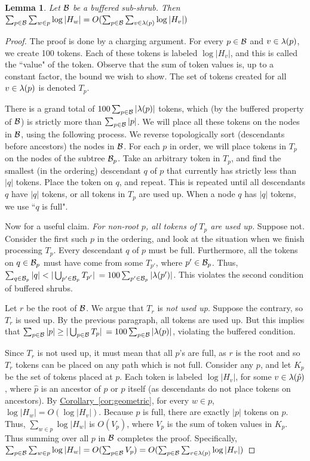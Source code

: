 \documentclass[11pt]{article}
\newtheorem{lemma}[theorem]{Lemma}
\theoremstyle{definition}
\newcommand{\Cor}[1]{\hyperref[cor:#1]{Corollary~\ref*{cor:#1}}} %
\begin{document}
\begin{lemma} \label{lem:buff}
 Let $\mathcal{B}$ be a buffered sub-shrub.  Then $\sum_{p\in \mathcal{B}}\sum_{w\in p} \log |H_w| = O(\sum_{p\in \mathcal{B}}\sum_{v\in \lambda(p)} \log |H_v| )$
\end{lemma}
\begin{proof} The proof is done by a charging argument. For every $p \in \mathcal{B}$
and $v \in \lambda(p)$, we create 100 tokens. Each of these tokens is labeled $\log |H_v|$,
and this is called the ``value" of the token. Observe that the sum of token values is, up to a constant
factor, the bound we wish to show. The set of tokens created for all $v \in \lambda(p)$ is denoted
$T_p$. 

There is a grand total of $100 \sum_{p \in \mathcal{B}} |\lambda(p)|$ tokens, which
(by the buffered property of $\mathcal{B}$) is strictly more than $\sum_{p \in \mathcal{B}} |p|$.
We will place all these tokens on the nodes in $\mathcal{B}$, using the following process.
We reverse topologically sort (descendants before ancestors) the nodes in $\mathcal{B}$.
For each $p$ in order, we will place tokens in $T_p$ on the nodes of the subtree $\mathcal{B}_p$.
Take an arbitrary token in $T_p$, and find the smallest (in the ordering) descendant $q$
of $p$ that currently has strictly less than $|q|$ tokens. Place the token on $q$,
and repeat. This is repeated until all descendants $q$ have $|q|$ tokens, or
all tokens in $T_p$ are used up. When a node $q$ has $|q|$ tokens, we use
``$q$ is full".

Now for a useful claim. \emph{For non-root $p$, all tokens of $T_p$ are used up.}
Suppose not. Consider the first such $p$ in the ordering, and look at the situation
when we finish processing $T_p$. Every descendant $q$ of $p$ must be full. Furthermore,
all the tokens on $q \in \mathcal{B}_p$ must have come from some $T_{p'}$, where $p' \in \mathcal{B}_p$.
Thus, $\sum_{q \in \mathcal{B}_p} |q| < |\bigcup_{p' \in \mathcal{B}_p} T_{p'}|$ $=100\sum_{p' \in \mathcal{B}_p} |\lambda(p')|$. This violates the second condition of buffered shrubs.

Let $r$ be the root of $\mathcal{B}$. We argue that $T_r$ is \emph{not used up}.
Suppose the contrary, so $T_r$ is used up. By the previous paragraph,
all tokens are used up. But this implies that $\sum_{p \in \mathcal{B}} |p| \geq |\bigcup_{p \in \mathcal{B}} T_p|$
$ = 100\sum_{p \in \mathcal{B}} |\lambda(p)|$, violating the buffered condition.

Since $T_r$ is not used up, it must mean that all $p$'s are full, as $r$ is the root and so $T_r$ tokens can be placed on any path which is not full. 
Consider any $p$, and let $K_p$ be the set of tokens placed at $p$. Each token is labeled $\log |H_v|$,
for some $v \in \lambda(\hat{p})$, where $\hat{p}$ is an ancestor of $p$ or $p$ itself (as descendants do not place tokens on ancestors). By \Cor{geometric},
for every $w \in p$, $\log |H_w| = O(\log |H_v|)$. Because $p$ is full,
there are exactly $|p|$ tokens on $p$. Thus, $\sum_{w \in p} \log |H_w|$
is $O(V_p)$, where $V_p$ is the sum of token values in $K_p$. 
Thus summing over all $p$ in $\mathcal{B}$ completes the proof. 
Specifically, $\sum_{p\in \mathcal{B}} \sum_{w \in p} \log |H_w| = O(\sum_{p\in \mathcal{B}} V_p) = O(\sum_{p\in \mathcal{B}}\sum_{v\in \lambda(p)} \log |H_v| )$


\end{proof}
\end{document}
